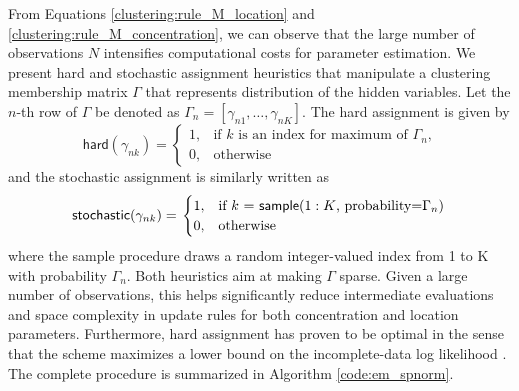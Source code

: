\documentclass[11pt]{article}
\begin{document}
From Equations \eqref{clustering:rule_M_location} and \eqref{clustering:rule_M_concentration}, we can observe that the large number of observations $N$ intensifies computational costs for parameter estimation. We present hard and stochastic assignment heuristics that manipulate a clustering membership matrix $\Gamma$ that represents distribution of the hidden variables. Let the $n$-th row of $\Gamma$ be denoted as $\Gamma_n = [\gamma_{n1},\ldots,\gamma_{nK}]$. The hard assignment is given by
\begin{equation}\label{clustering:Estep_hard}
\textsf{hard}(\gamma_{nk}) = \left. 
\begin{cases}
1, & \text{if $k$ is an index for maximum of $\Gamma_n$,}\\
0, & \text{otherwise}
\end{cases}
\right.
\end{equation}
and the stochastic assignment is similarly written as 
\begin{equation}\label{clustering:Estep_stochastic}
\textsf{stochastic}(\gamma_{nk}) = \left.
\begin{cases}
1, & \text{if $k$ = \textsf{sample}($1:K$, probability=$\Gamma_n)$}\\
0, & \text{otherwise}
\end{cases}
\right.
\end{equation}
where the \textsf{sample} procedure draws a random integer-valued index from 1 to K with probability $\Gamma_n$. Both heuristics aim at making $\Gamma$ sparse. Given a large number of observations, this helps significantly reduce intermediate evaluations and space complexity in update rules for both concentration and location parameters. Furthermore, hard assignment has proven to be optimal in the sense that the scheme maximizes a lower bound on the incomplete-data log likelihood \citep{banerjee_clustering_2005}. The complete procedure is summarized in Algorithm \ref{code:em_spnorm}. 
\end{document}
